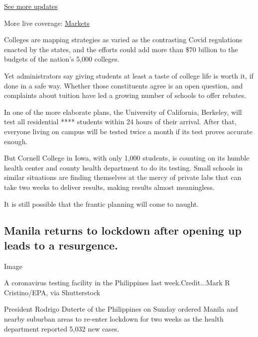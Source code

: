 \href{https://www.nytimes3xbfgragh.onion/2020/08/04/world/coronavirus-cases.html?action=click\&pgtype=Article\&state=default\&region=MAIN_CONTENT_1\&context=storylines_live_updates}{See
more updates}

More live coverage:
\href{https://www.nytimes3xbfgragh.onion/live/2020/08/04/business/stock-market-today-coronavirus?action=click\&pgtype=Article\&state=default\&region=MAIN_CONTENT_1\&context=storylines_live_updates}{Markets}

Colleges are mapping strategies as varied as the contrasting Covid
regulations enacted by the states, and the efforts could add more than
\$70 billion to the budgets of the nation's 5,000 colleges.

Yet administrators say giving students at least a taste of college life
is worth it, if done in a safe way. Whether those constituents agree is
an open question, and complaints about tuition have led a growing number
of schools to offer rebates.

In one of the more elaborate plans, the University of California,
Berkeley, will test all residential **** students within 24 hours of
their arrival. After that, everyone living on campus will be tested
twice a month if its test proves accurate enough.

But Cornell College in Iowa, with only 1,000 students, is counting on
its humble health center and county health department to do its testing.
Small schools in similar situations are finding themselves at the mercy
of private labs that can take two weeks to deliver results, making
results almost meaningless.

It is still possible that the frantic planning will come to naught.

\hypertarget{manila-returns-to-lockdown-after-opening-up-leads-to-a-resurgence}{%
\subsection{Manila returns to lockdown after opening up leads to a
resurgence.}\label{manila-returns-to-lockdown-after-opening-up-leads-to-a-resurgence}}

Image

A coronavirus testing facility in the Philippines last
week.Credit...Mark R Cristino/EPA, via Shutterstock

President Rodrigo Duterte of the Philippines on Sunday ordered Manila
and nearby suburban areas to re-enter lockdown for two weeks as the
health department reported 5,032 new cases.


